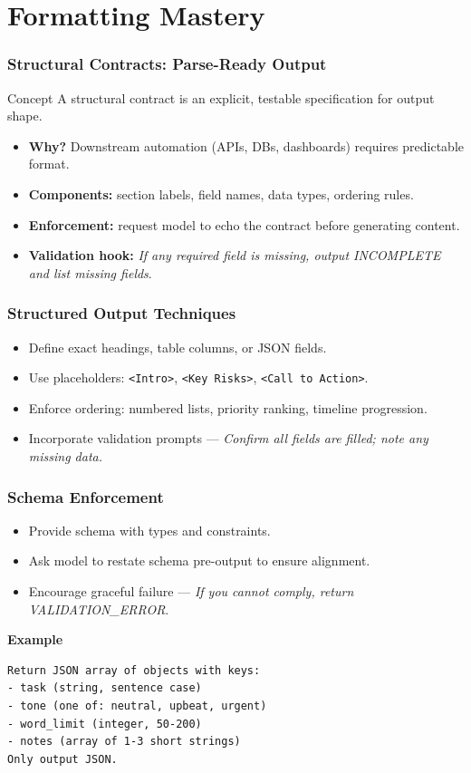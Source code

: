 \documentclass{beamer}
\begin{document}
\section{Formatting Mastery}

\begin{frame}
    \frametitle{Structural Contracts: Parse-Ready Output}
    \begin{block}{Concept}
        A structural contract is an explicit, testable specification for output shape.
    \end{block}
    \begin{itemize}
        \item \textbf{Why?} Downstream automation (APIs, DBs, dashboards) requires predictable format.
        \item \textbf{Components:} section labels, field names, data types, ordering rules.
        \item \textbf{Enforcement:} request model to echo the contract before generating content.
        \item \textbf{Validation hook:} \emph{If any required field is missing, output INCOMPLETE and list missing fields}.
    \end{itemize}
\end{frame}

\begin{frame}
    \frametitle{Structured Output Techniques}
    \begin{itemize}
        \item Define exact headings, table columns, or JSON fields.
        \item Use placeholders: \texttt{<Intro>}, \texttt{<Key Risks>}, \texttt{<Call to Action>}.
        \item Enforce ordering: numbered lists, priority ranking, timeline progression.
    \item Incorporate validation prompts — \emph{Confirm all fields are filled; note any missing data.} 
    \end{itemize}
\end{frame}

\begin{frame}[fragile]
    \frametitle{Schema Enforcement}
    \begin{itemize}
        \item Provide schema with types and constraints.
        \item Ask model to restate schema pre-output to ensure alignment.
        \item Encourage graceful failure — \emph{If you cannot comply, return VALIDATION\_ERROR}.
    \end{itemize}
\vspace{0.2cm}
\textbf{Example}
\begin{verbatim}
Return JSON array of objects with keys:
- task (string, sentence case)
- tone (one of: neutral, upbeat, urgent)
- word_limit (integer, 50-200)
- notes (array of 1-3 short strings)
Only output JSON.
\end{verbatim}
\end{frame}
\end{document}
